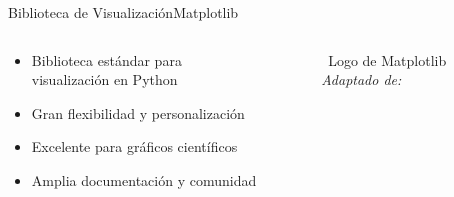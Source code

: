 \begin{frame}{Biblioteca de Visualización}{Matplotlib}
    \begin{columns}
        \begin{column}{0.6\textwidth}
            \begin{itemize}
                \item Biblioteca estándar para visualización en Python
                \item Gran flexibilidad y personalización
                \item Excelente para gráficos científicos
                \item Amplia documentación y comunidad
            \end{itemize}
        \end{column}
        \begin{column}{0.4\textwidth}
            \centering
            \begin{figure}[H]
                \centering
                \vspace{-0.25cm}
                \caption{\tiny~Logo de Matplotlib \textit{Adaptado de:}~\cite{Hunter:2007}}%
                \label{fig:Matplotlib_logo}
            \end{figure}
        \end{column}
    \end{columns}
\end{frame}

